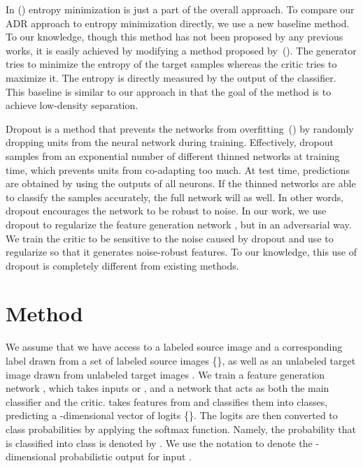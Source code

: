 \documentclass{article} \usepackage{iclr2018_conference,times}
\begin{document}
In (\cite{long2016unsupervised}) entropy minimization is just a part of the overall approach. To compare our ADR approach to entropy minimization directly, we use a new baseline method. To our knowledge, though this method has not been proposed by any previous works, it is easily achieved by modifying a method proposed by~(\cite{springenberg2015unsupervised}). The generator tries to minimize the entropy of the target samples whereas the critic tries to maximize it. The entropy is directly measured by the output of the classifier. This baseline is similar to our approach in that the goal of the method is to achieve low-density separation. 


 Dropout is a method that prevents the networks from overfitting~(\cite{srivastava2014dropout}) by randomly dropping units from the neural network during training. Effectively, dropout samples from an exponential number of different thinned networks at training time, which prevents units from co-adapting too much. At test time, predictions are obtained by using the outputs of all neurons. If the thinned networks are able to classify the samples accurately, the full network will as well. In other words, dropout encourages the network to be robust to noise. In our work, we use dropout to regularize the feature generation network , but in an adversarial way. We train the critic  to be sensitive to the noise caused by dropout and use  to regularize  so that it generates noise-robust features. To our knowledge, this use of dropout is completely different from existing methods.

\section{Method}\label{sec:method}
\vspace{-3mm}        
We assume that we have access to a labeled source image  and a corresponding label  drawn from a set of labeled source images \{\},
as well as an unlabeled target image  drawn from unlabeled target images . 
We train a feature generation network , which takes inputs  or , and a network  that acts as both the main classifier and the critic.  takes features from  and classifies them into  classes, predicting a -dimensional vector of logits \{\}. The logits are then converted to class probabilities by applying the softmax function. Namely, the probability that  is classified into class  is denoted by . We use the notation  to denote the -dimensional probabilistic output for input .
\end{document}
